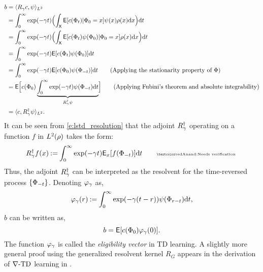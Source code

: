 \begin{equation}
\begin{aligned}
b & = \langle R_\discount c, \basis \rangle_{L^2} \\
& = \int_0^\infty \exp(-\discount t)  \Bigl(\int_{\state} \Expect[c(\markovstate_t)| \markovstate_0 = x] \basis(x)  \pr(x) \ud x \Bigr) \ud t \\
& = \int_0^\infty \exp(-\discount t)  \Bigl(\int_{\state} \Expect[c(\markovstate_t) \basis(\markovstate_0)| \markovstate_0 = x]  \pr(x) \ud x \Bigr) \ud t \\
& = \int_0^\infty \exp(-\discount t) \Expect[c(\markovstate_t) \basis(\markovstate_0)]\ud t \\
& = \int_0^\infty \exp(-\discount t) \Expect[c(\markovstate_0) \basis(\markovstate_{-t})] \ud t \qquad \text{(Applying the stationarity property of $\markovstate$)}\\
& = \Expect\Bigl[c(\markovstate_0) \underbrace{\int_0^\infty \exp(-\discount t) \basis(\markovstate_{-t})\ud t}_{R^\dagger_\discount \basis}\Bigr]  \qquad \text{(Applying Fubini's theorem and absolute integrability)}\\
& = \langle c, R^\dagger_\discount \basis \rangle_{L^2}.
\label{e:lstd_resolution}
\end{aligned}
\end{equation}
It can be seen from \eqref{e:lstd_resolution} that the adjoint $R^\dagger_\gamma$ operating on a function $f$ in $L^2(\rho)$ takes the form:
\[
R^\dagger_\discount f(x) \eqdef \int_0^\infty \exp(-\discount t ) \Expect_x[f(\markovstate_{-t})] \ud t \qquad \text{\anand{Needs verification}}
\]
Thus, the adjoint $R^\dagger_\gamma$ can be interpreted as the resolvent for the time-reversed process $\{\Phi_{-t}\}$. 
Denoting $\varphi_\gamma$ as,
\begin{equation}
\eligibvector_\discount(r) \eqdef \int_0^\infty \exp(-\discount (t -r)) \basis(\markovstate_{r-t}) \ud t,
\label{e:lstd_eligib}
\end{equation}
$b$ can be written as,
\begin{equation}
b = \Expect[c(\markovstate_0) \eligibvector_\discount(0)].
\label{e:lstd_b}
\end{equation}
The function $\varphi_\gamma$ is called the \textit{eligibility vector} in TD learning. A slightly more general proof using the generalized resolvent kernel $R_G$ appears in the derivation of $\nabla\text{-TD}$ learning in .

